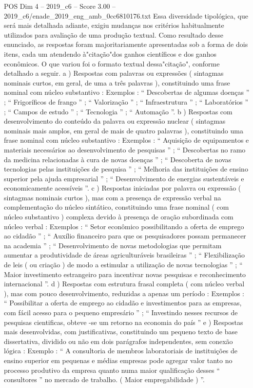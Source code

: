 \begin{textsample}{POS Dim 4 – 2019\_c6 – Score 3.00 – 2019\_c6/enade\_2019\_eng\_amb\_0cc6810176.txt}
Essa diversidade tipológica, que será mais detalhada adiante, exigiu mudanças nos critérios habitualmente utilizados para avaliação de uma produção textual.
Como resultado desse enunciado, as respostas foram majoritariamente apresentadas sob a forma de dois itens, cada um atendendo à"citação"dos ganhos científicos e dos ganhos econômicos.
O que variou foi o formato textual dessa"citação", conforme detalhado a seguir. a ) Respostas com palavras ou expressões ( sintagmas nominais curtos, em geral, de uma a três palavras ), constituindo uma frase nominal com núcleo substantivo : Exemplos : “ Descobertas de algumas doenças ” ; “ Frigoríficos de frango ” ; “ Valorização ” ; “ Infraestrutura ” ; “ Laboratórios ” ; “ Campos de estudo ” ; “ Tecnologia ” ; “ Automação ”. b ) Respostas com desenvolvimento do conteúdo da palavra ou expressão nuclear ( sintagmas nominais mais amplos, em geral de mais de quatro palavras ), constituindo uma frase nominal com núcleo substantivo : Exemplos : “ Aquisição de equipamentos e materiais necessários ao desenvolvimento de pesquisas ” ; “ Descobertas no ramo da medicina relacionadas à cura de novas doenças ” ; “ Descoberta de novas tecnologias pelas instituições de pesquisa ” ; “ Melhoria das instituições de ensino superior pela ajuda empresarial ” ; “ Desenvolvimento de energias sustentáveis e economicamente acessíveis ”. c ) Respostas iniciadas por palavra ou expressão ( sintagmas nominais curtos ), mas com a presença de expressão verbal na complementação do núcleo sintático, constituindo uma frase nominal ( com núcleo substantivo ) complexa devido à presença de oração subordinada com núcleo verbal : Exemplos : “ Setor econômico possibilitando a oferta de emprego ao cidadão ” ; “ Auxílio financeiro para que os pesquisadores possam permanecer na academia ” ; “ Desenvolvimento de novas metodologias que permitam aumentar a produtividade de áreas agriculturáveis brasileiras ” ; “ Flexibilização de leis ( ou criação ) de modo a estimular a utilização de novas tecnologias ” ; “ Maior investimento estrangeiro para incentivar novas pesquisas e reconhecimento internacional ”. d ) Respostas com estrutura frasal completa ( com núcleo verbal ), mas com pouco desenvolvimento, reduzidas a apenas um período : Exemplos : “ Possibilitar a oferta de emprego ao cidadão e investimentos para as empresas, com fácil acesso para o pequeno empresário ” ; “ Investindo nesses recursos de pesquisas cientificas, obteve -se um retorno na economia do país ” e ) Respostas mais desenvolvidas, com justificativas, constituindo um pequeno texto de base dissertativa, dividido ou não em dois parágrafos independentes, sem conexão lógica : Exemplo : “ A consultoria de membros laboratoriais de instituições de ensino superior em pequenas e médias empresas pode agregar valor tanto no processo produtivo da empresa quanto numa maior qualificação desses “ consultores ” no mercado de trabalho. ( Maior empregabilidade ) ”.

\end{textsample}
